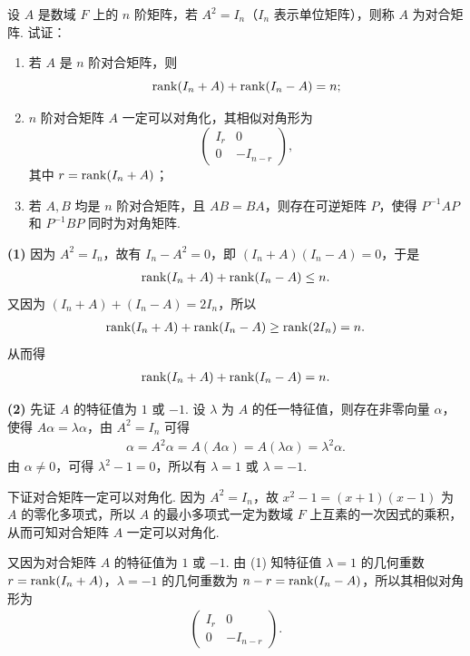 设 $A$ 是数域 $F$ 上的 $n$ 阶矩阵，若 $A^2=I_n$（$I_n$ 表示单位矩阵），则称 $A$ 为对合矩阵. 试证：
\begin{enumerate}
  \item 若 $A$ 是 $n$ 阶对合矩阵，则
  \[
    \operatorname{rank}(I_n+A)+\operatorname{rank}(I_n-A)=n;
  \]
  \item $n$ 阶对合矩阵 $A$ 一定可以对角化，其相似对角形为
  \[
    \begin{pmatrix}
      I_r & 0\\
      0 & -I_{n-r}
    \end{pmatrix},
  \]
  其中 $r=\operatorname{rank}(I_n+A)$；
  \item 若 $A,B$ 均是 $n$ 阶对合矩阵，且 $AB=BA$，则存在可逆矩阵 $P$，使得 $P^{-1}AP$ 和 $P^{-1}BP$ 同时为对角矩阵.
\end{enumerate}
\begin{solution}
\textbf{(1)} 因为 $A^2=I_n$，故有 $I_n-A^2=0$，即 $(I_n+A)(I_n-A)=0$，于是
\begin{align*}
\operatorname{rank}(I_n+A)+\operatorname{rank}(I_n-A)\le n.
\end{align*}
又因为 $(I_n+A)+(I_n-A)=2I_n$，所以
\begin{align*}
\operatorname{rank}(I_n+A)+\operatorname{rank}(I_n-A)\ge\operatorname{rank}(2I_n)=n.
\end{align*}
从而得
\begin{align*}
\operatorname{rank}(I_n+A)+\operatorname{rank}(I_n-A)=n.
\end{align*}

\textbf{(2)} 先证 $A$ 的特征值为 $1$ 或 $-1$. 设 $\lambda$ 为 $A$ 的任一特征值，则存在非零向量 $\alpha$，使得 $A\alpha=\lambda\alpha$，由 $A^2=I_n$ 可得
\begin{align*}
\alpha=A^2\alpha=A(A\alpha)=A(\lambda\alpha)=\lambda^2\alpha.
\end{align*}
由 $\alpha\ne0$，可得 $\lambda^2-1=0$，所以有 $\lambda=1$ 或 $\lambda=-1$.

下证对合矩阵一定可以对角化. 因为 $A^2=I_n$，故 $x^2-1=(x+1)(x-1)$ 为 $A$ 的零化多项式，所以 $A$ 的最小多项式一定为数域 $F$ 上互素的一次因式的乘积，从而可知对合矩阵 $A$ 一定可以对角化.

又因为对合矩阵 $A$ 的特征值为 $1$ 或 $-1$. 由 (1) 知特征值 $\lambda=1$ 的几何重数 $r=\operatorname{rank}(I_n+A)$，$\lambda=-1$ 的几何重数为 $n-r=\operatorname{rank}(I_n-A)$，所以其相似对角形为
\begin{align*}
\begin{pmatrix}
  I_r & 0\\
  0 & -I_{n-r}
\end{pmatrix}.
\end{align*}


\end{solution}
